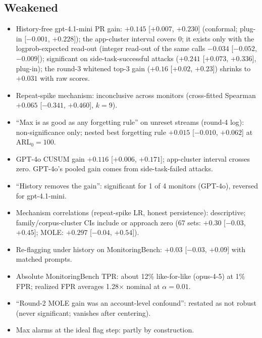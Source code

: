 \documentclass[11pt]{article}
\newcommand{\m}{\ensuremath{-}}
\begin{document}
\subsection*{Weakened}
\begin{itemize}
\item History-free gpt-4.1-mini PR gain: $+0.145$ [$+0.007$, $+0.230$] (conformal; plug-in [$\m0.001$, $+0.228$]); the app-cluster interval covers 0; it exists only with the logprob-expected read-out (integer read-out of the same calls $\m0.034$ [$\m0.052$, $\m0.009$]); significant on side-task-successful attacks ($+0.241$ [$+0.073$, $+0.336$], plug-in); the round-3 whitened top-3 gain ($+0.16$ [$+0.02$, $+0.23$]) shrinks to $+0.031$ with raw scores.
\item Repeat-spike mechanism: inconclusive across monitors (cross-fitted Spearman $+0.065$ [$\m0.341$, $+0.460$], $k=9$).
\item ``Max is as good as any forgetting rule'' on unreset streams (round-4 log): non-significance only; nested best forgetting rule $+0.015$ [$\m0.010$, $+0.062$] at ARL$_0=100$.
\item GPT-4o CUSUM gain $+0.116$ [$+0.006$, $+0.171$]; app-cluster interval crosses zero. GPT-4o's pooled gain comes from side-task-failed attacks.
\item ``History removes the gain'': significant for 1 of 4 monitors (GPT-4o), reversed for gpt-4.1-mini.
\item Mechanism correlations (repeat-spike LR, honest persistence): descriptive; family/corpus-cluster CIs include or approach zero (67 sets: $+0.30$ [$\m0.03$, $+0.45$]; MOLE: $+0.297$ [$\m0.04$, $+0.54$]).
\item Re-flagging under history on MonitoringBench: $+0.03$ [$\m0.03$, $+0.09$] with matched prompts.
\item Absolute MonitoringBench TPR: about 12\% like-for-like (opus-4-5) at 1\% FPR; realized FPR averages 1.28$\times$ nominal at $\alpha=0.01$.
\item ``Round-2 MOLE gain was an account-level confound'': restated as not robust (never significant; vanishes after centering).
\item Max alarms at the ideal flag step: partly by construction.
\end{itemize}
\end{document}
